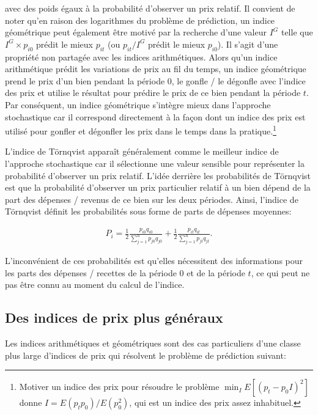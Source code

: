 \documentclass[
]{article}
\begin{document}
avec des poids égaux à la probabilité d'observer un prix relatif. Il convient de noter qu'en raison des logarithmes du problème de prédiction, un indice géométrique peut également être motivé par la recherche d'une valeur \(I^{G}\) telle que \(I^{G} \times p_{i0}\) prédit le mieux \(p_{it}\) (ou \(p_{it} / I^{G}\) prédit le mieux \(p_{i0}\)). Il s'agit d'une propriété non partagée avec les indices arithmétiques. Alors qu'un indice arithmétique prédit les variations de prix au fil du temps, un indice géométrique prend le prix d'un bien pendant la période 0, le gonfle / le dégonfle avec l'indice des prix et utilise le résultat pour prédire le prix de ce bien pendant la période \(t\). Par conséquent, un indice géométrique s'intègre mieux dans l'approche stochastique car il correspond directement à la façon dont un indice des prix est utilisé pour gonfler et dégonfler les prix dans le temps dans la pratique.\footnote{Motiver un indice des prix pour résoudre le problème \(\min_{I} E[(p_{t} - p_{0} I)^{2}]\) donne \(I = E(p_{t} p_{0}) / E(p_{0}^{2})\), qui est un indice des prix assez inhabituel.}

L'indice de Törnqvist apparaît généralement comme le meilleur indice de l'approche stochastique car il sélectionne une valeur sensible pour représenter la probabilité d'observer un prix relatif. L'idée derrière les probabilités de Törnqvist est que la probabilité d'observer un prix particulier relatif à un bien dépend de la part des dépenses / revenus de ce bien sur les deux périodes. Ainsi, l'indice de Törnqvist définit les probabilités sous forme de parts de dépenses moyennes:

\begin{align*}
P_{i} = \frac{1}{2} \frac{p_{i0} q_{i0}}{\sum_{j = 1}^{n} p_{j0} q_{j0}} + \frac{1}{2} \frac{p_{it} q_{it}}{\sum_{j = 1}^{n} p_{jt} q_{jt}}.
\end{align*}

L'inconvénient de ces probabilités est qu'elles nécessitent des informations pour les parts des dépenses / recettes de la période 0 et de la période \(t\), ce qui peut ne pas être connu au moment du calcul de l'indice.

\hypertarget{des-indices-de-prix-plus-guxe9nuxe9raux}{%
\subsection{Des indices de prix plus généraux}\label{des-indices-de-prix-plus-guxe9nuxe9raux}}

Les indices arithmétiques et géométriques sont des cas particuliers d'une classe plus large d'indices de prix qui résolvent le problème de prédiction suivant:
\end{document}
